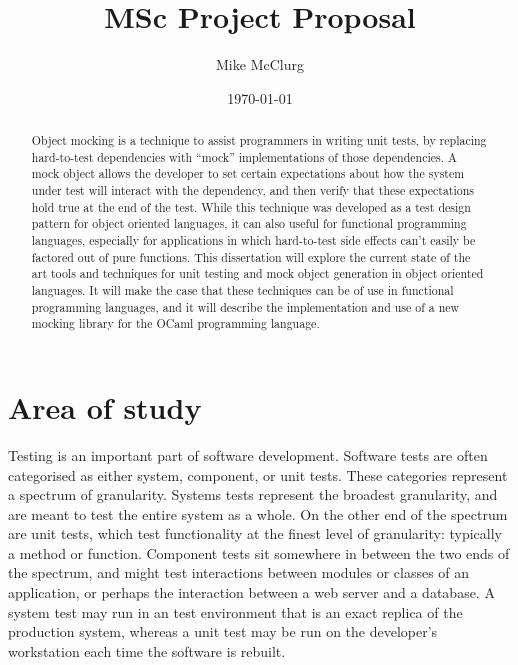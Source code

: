 \documentclass[proposal]{softeng}
\title{MSc Project Proposal}
\author{Mike McClurg}
\date{\today}
\begin{document}
\maketitle

\begin{abstract}


  Object mocking is a technique to assist programmers in writing unit
  tests, by replacing hard-to-test dependencies with ``mock''
  implementations of those dependencies. A mock object allows the
  developer to set certain expectations about how the system under test
  will interact with the dependency, and then verify that these
  expectations hold true at the end of the test. While this technique
  was developed as a test design pattern for object oriented
  languages, it can also useful for functional programming languages,
  especially for applications in which hard-to-test side effects can't
  easily be factored out of pure functions. This dissertation will
  explore the current state of the art tools and techniques for unit
  testing and mock object generation in object oriented languages. It
  will make the case that these techniques can be of use in functional
  programming languages, and it will describe the implementation and
  use of a new mocking library for the OCaml programming language.


\end{abstract}

\section{Area of study}


Testing is an important part of software development. Software tests
are often categorised as either system, component, or unit
tests. These categories represent a spectrum of granularity. Systems
tests represent the broadest granularity, and are meant to test the
entire system as a whole. On the other end of the spectrum are unit
tests, which test functionality at the finest level of granularity:
typically a method or function. Component tests sit somewhere in
between the two ends of the spectrum, and might test interactions
between modules or classes of an application, or perhaps the
interaction between a web server and a database. A system test may run
in an test environment that is an exact replica of the production
system, whereas a unit test may be run on the developer's workstation
each time the software is rebuilt.
\end{document}
